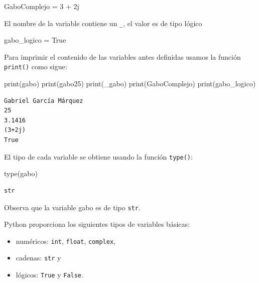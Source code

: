 \documentclass[
  spanish,
  letterpaper,
]{scrbook}
\newenvironment{Shaded}{\begin{snugshade}}{\end{snugshade}}
\newcommand{\BuiltInTok}[1]{\textcolor[rgb]{0.00,0.23,0.31}{#1}}
\newcommand{\DecValTok}[1]{\textcolor[rgb]{0.68,0.00,0.00}{#1}}
\newcommand{\NormalTok}[1]{\textcolor[rgb]{0.00,0.23,0.31}{#1}}
\newcommand{\OperatorTok}[1]{\textcolor[rgb]{0.37,0.37,0.37}{#1}}
\newcommand{\OtherTok}[1]{\textcolor[rgb]{0.00,0.23,0.31}{#1}}
\newcommand{\VariableTok}[1]{\textcolor[rgb]{0.07,0.07,0.07}{#1}}
\providecommand{\tightlist}{%
  \setlength{\itemsep}{0pt}\setlength{\parskip}{0pt}}
\theoremstyle{definition}
\theoremstyle{remark}
\begin{document}
\begin{Shaded}
\begin{Highlighting}[]
\NormalTok{GaboComplejo }\OperatorTok{=} \DecValTok{3} \OperatorTok{+} \OtherTok{2j}  
\end{Highlighting}
\end{Shaded}

El nombre de la variable contiene un \texttt{\_}, el valor es de tipo
lógico

\begin{Shaded}
\begin{Highlighting}[]
\NormalTok{gabo\_logico }\OperatorTok{=} \VariableTok{True} 
\end{Highlighting}
\end{Shaded}

Para imprimir el contenido de las variables antes definidas usamos la
función \texttt{print()} como sigue:

\begin{Shaded}
\begin{Highlighting}[]
\BuiltInTok{print}\NormalTok{(gabo)}
\BuiltInTok{print}\NormalTok{(gabo25)}
\BuiltInTok{print}\NormalTok{(\_gabo)}
\BuiltInTok{print}\NormalTok{(GaboComplejo)}
\BuiltInTok{print}\NormalTok{(gabo\_logico)}
\end{Highlighting}
\end{Shaded}

\begin{verbatim}
Gabriel García Márquez
25
3.1416
(3+2j)
True
\end{verbatim}

El tipo de cada variable se obtiene usando la función \texttt{type()}:

\begin{Shaded}
\begin{Highlighting}[]
\BuiltInTok{type}\NormalTok{(gabo)}
\end{Highlighting}
\end{Shaded}

\begin{verbatim}
str
\end{verbatim}

Observa que la variable gabo es de tipo \texttt{str}.

Python proporciona los siguientes tipos de variables básicas:

\begin{itemize}
\tightlist
\item
  numéricos: \texttt{int}, \texttt{float}, \texttt{complex},
\item
  cadenas: \texttt{str} y
\item
  lógicos: \texttt{True} y \texttt{False}.
\end{itemize}
\end{document}
